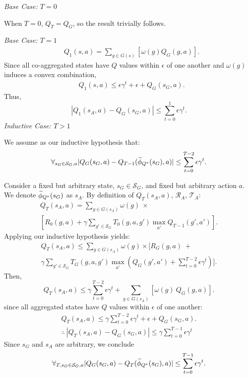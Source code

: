 \textit{Base Case: $T = 0$}

When $T = 0$, $Q_T = Q_G$, so the result trivially follows.

\textit{Base Case: $T = 1$}
\begin{align*}
&Q_1(s,a) = \underset{g \in G(s)}{\sum} \left[ \omega(g)Q_G(g,a) \right].
\end{align*}
Since all co-aggregated states have $Q$ values within $\epsilon$ of one another and $\omega(g)$ induces a convex combination,
\begin{align*}
&Q_1(s,a) \leq \epsilon \gamma^t + \epsilon + Q_G(s_G, a).
\end{align*}
Thus,
\begin{equation}
\left| Q_{1}(s_A, a) - Q_G(s_G,a) \right| \leq \sum_{t=0}^{1}\epsilon \gamma^t.
\end{equation}
\textit{Inductive Case: $T > 1$}

We assume as our inductive hypothesis that:
\begin{equation}
\forall_{s_G \in \mathcal{S}_G, a} |Q_G(s_G, a) - Q_{T-1}(\widetilde \phi_{Q^*}(s_G), a)| \leq \sum_{t=0}^{T-2} \epsilon \gamma^t.
\end{equation}

Consider a fixed but arbitrary state, $s_G \in \mathcal{S}_G$, and fixed but arbitrary action $a$.
We denote $\widetilde \phi_{Q^*}(s_G)$ as $s_A$. 
By definition of $Q_{T}(s_A, a)$, $\mathcal{R}_A$, $\mathcal{T}_A$:
\begin{multline*}
Q_T(s_A, a) = \sum_{g \in G(s_A)}\omega(g)\ \times \\ 
 \left[ R_0(g,a) + \gamma \sum_{g' \in \mathcal{S}_G} T_0(g,a,g') \max_{a'} Q_{T-1}(g', a')      \right].
\end{multline*}
Applying our inductive hypothesis yields:
\begin{multline*}
Q_T(s_A, a) \leq \sum_{g \in G(s_A)}\omega(g) \times \biggl[ R_G(g,a)\ + \\ \gamma \sum_{g' \in \mathcal{S}_G} T_G(g,a,g') \max_{a'}(Q_G(g', a') + \sum_{t=0}^{T-2} \epsilon \gamma^t) \biggr].
\end{multline*}
Then,
\begin{equation*}
Q_T(s_A, a) \leq \gamma\sum_{t=0}^{T-2} \epsilon \gamma^t + \sum_{g \in G(s_A)}\left[ \omega(g)\ Q_G(g,a)\right].
\end{equation*}
since all aggregated states have $Q$ values within $\epsilon$ of one another:
\begin{align*}
Q_T(s_A, a) \leq \gamma\sum_{t=0}^{T-2} \epsilon \gamma^t + \epsilon + Q_G(s_G, a). \\
\therefore\ \left| Q_{T}(s_A, a) - Q_G(s_G,a) \right| \leq \gamma\sum_{t=0}^{T-1}\epsilon \gamma^t
\end{align*}
Since $s_G$ and $s_A$ are arbitrary, we conclude
\begin{equation}
\forall_{T, s_G \in \mathcal{S}_G, a} |Q_G(s_G, a) - Q_T(\widetilde \phi_{Q^*}(s_G), a)| \leq \sum_{t=0}^{T-1} \epsilon \gamma^t.
\end{equation}

